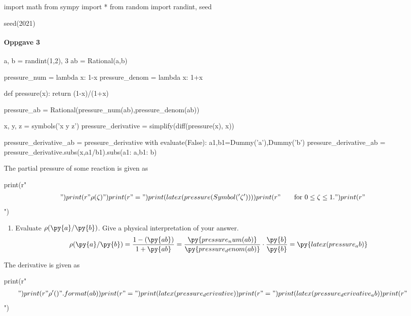 \documentclass{article}
\begin{document}
\begin{pycode}
import math
from sympy import *
from random import randint, seed

seed(2021)
\end{pycode}

\paragraph{Oppgave 3}

\begin{pycode}
a, b = randint(1,2), 3
ab = Rational(a,b)

pressure_num = lambda x: 1-x
pressure_denom = lambda x: 1+x

def pressure(x):
  return (1-x)/(1+x)

pressure_ab = Rational(pressure_num(ab),pressure_denom(ab))

x, y, z = symbols('x y z')
pressure_derivative = simplify(diff(pressure(x), x))

pressure_derivative_ab = pressure_derivative
with evaluate(False):
    a1,b1=Dummy('a'),Dummy('b')
    pressure_derivative_ab = pressure_derivative.subs(x,a1/b1).subs({a1: a,b1: b})

\end{pycode}

The partial pressure of some reaction is given as
%
\begin{pycode}
print(r"\begin{align*}")
print(r"\rho(\zeta)")
print(r"=")
print(latex(pressure(Symbol('\zeta'))))
print(r"\qquad \text{for} \ 0 \leq \zeta \leq 1.")
print(r"\end{align*}")
\end{pycode}
%
\begin{enumerate}[label=\alph*)]
    \item Evaluate $\rho(\py{a}/\py{b})$. Give a physical interpretation of your
        answer.
    \begin{equation*}
        \rho(\py{a}/\py{b})
        = \frac{1-(\py{ab})}{1+\py{ab}}
        = \frac{\py{pressure_num(ab)}}{\py{pressure_denom(ab)}}
        \cdot \frac{\py{b}}{\py{b}}
        = \py{latex(pressure_ab)}
    \end{equation*}
\end{enumerate}

The derivative is given as
%
\begin{pycode}
print(r"\begin{align*}")
print(r"\rho'({})".format(ab))
print(r"=")
print(latex(pressure_derivative))
print(r"=")
print(latex(pressure_derivative_ab))
print(r"\end{align*}")
\end{pycode}
\end{document}

